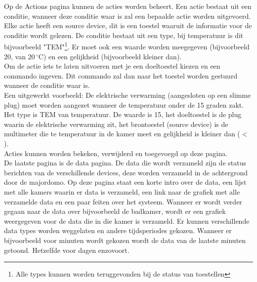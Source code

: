 \documentclass{article}
\begin{document}
\label{subsec:actiondescription}Op de Actions pagina kunnen de acties worden beheert. Een actie bestaat uit een conditie, wanneer deze conditie waar is zal een bepaalde actie worden uitgevoerd. Elke actie heeft een source device, dit is een toestel waaruit de informatie voor de conditie wordt gelezen. De conditie bestaat uit een type, bij temperatuur is dit bijvoorbeeld "TEM"\footnote{Alle types kunnen worden teruggevonden bij de status van toestellen}. Er moet ook een waarde worden meegegeven (bijvoorbeeld 20, van $20\,^{\circ}\mathrm{C}$) en een gelijkheid (bijvoorbeeld kleiner dan).\\
Om de actie iets te laten uitvoeren met je een doeltoestel kiezen en een commando ingeven. Dit commando zal dan naar het toestel worden gestuurd wanneer de conditie waar is.\\
Een uitgewerkt voorbeeld: De elektrische verwarming (aangesloten op een slimme plug) moet worden aangezet wanneer de temperatuur onder de 15 graden zakt. Het type is TEM van temperatuur. De waarde is 15, het doeltoestel is de plug waarin de elektrische verwarming zit, het brontoestel (source device) is de multimeter die te temperatuur in de kamer meet en gelijkheid is kleiner dan ($<$).\\
Acties kunnen worden bekeken, verwijderd en toegevoegd op deze pagina.\\

De laatste pagina is de data pagina. De data die wordt verzameld zijn de status berichten van de verschillende devices, deze worden verzameld in de achtergrond door de majordomo. Op deze pagina staat een korte intro over de data, een lijst met alle kamers waarin er data is verzameld, een link naar de grafiek met alle verzamelde data en een paar feiten over het systeem. Wanneer er wordt verder gegaan naar de data over bijvoorbeeld de badkamer, wordt er een grafiek weergegeven voor de data die in die kamer is verzameld. Er kunnen verschillende data types worden weggelaten en andere tijdsperiodes gekozen. Wanneer er bijvoorbeeld voor minuten wordt gekozen wordt de data van de laatste minuten getoond. Hetzelfde voor dagen enzovoort.\\
\end{document}
